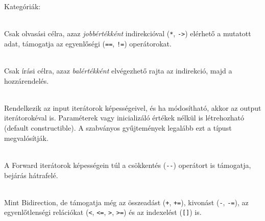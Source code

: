 \begin{frame}
    Kategóriák:
    \begin{description}[m]
        \item[Input] \hfill \\ Csak olvasási célra, azaz \emph{jobbértékként} indirekcióval (\texttt{*}, \texttt{->}) elérhető a mutatott adat, támogatja az egyenlőségi (\texttt{==}, \texttt{!=}) operátorokat.
        \item[Output] \hfill \\ Csak írási célra, azaz \emph{balértékként} elvégezhető rajta az indirekció, majd a hozzárendelés.
        \item[Forward] \hfill \\ Rendelkezik az input iterátorok képességeivel, és ha módosítható, akkor az output iterátorokéval is. Paraméterek vagy inicializáló értékek nélkül is létrehozható (default constructible). A szabványos gyűjtemények legalább ezt a típust megvalósítják.
    \end{description}
\end{frame}

\begin{frame}
    \begin{description}[m]
        \small
        \item[Bidirectional] \hfill \\ A Forward iterátorok képességein túl a csökkentés (\texttt{-{-}}) operátort is támogatja, bejárás hátrafelé.
        \item[Random access] \hfill \\ Mint Bidirection, de támogatja még az összeadást (\texttt{+}, \texttt{+=}), kivonást (\texttt{-}, \texttt{-=}), az egyenlőtlenségi relációkat (\texttt{<}, \texttt{<=}, \texttt{>}, \texttt{>=}) és az indexelést (\texttt{[]}) is. 
    \end{description}
    \begin{exampleblock}{}
        \scriptsize
        
    \end{exampleblock}
\end{frame}
